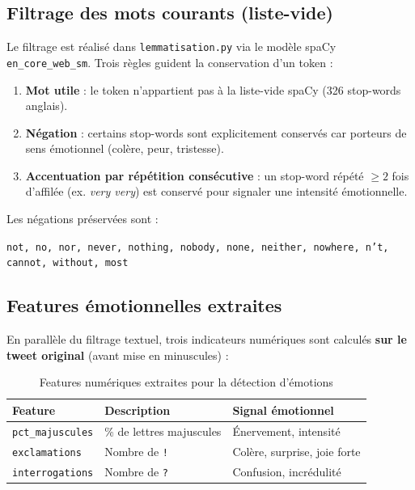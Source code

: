 \documentclass[12pt, a4paper]{article}
\begin{document}
\subsection{Filtrage des mots courants (liste-vide)}

Le filtrage est réalisé dans \texttt{lemmatisation.py} via le modèle spaCy
\texttt{en\_core\_web\_sm}. Trois règles guident la conservation d'un token :

\begin{enumerate}
    \item \textbf{Mot utile} : le token n'appartient pas à la liste-vide spaCy (326 stop-words anglais).
    \item \textbf{Négation} : certains stop-words sont explicitement conservés car porteurs de sens
          émotionnel (colère, peur, tristesse).
    \item \textbf{Accentuation par répétition consécutive} : un stop-word répété $\geq 2$ fois
          d'affilée (ex. \textit{very very}) est conservé pour signaler une intensité émotionnelle.
\end{enumerate}

Les négations préservées sont :

\begin{center}
\texttt{not, no, nor, never, nothing, nobody, none, neither, nowhere, n't, cannot, without, most}
\end{center}

\subsection{Features émotionnelles extraites}

En parallèle du filtrage textuel, trois indicateurs numériques sont calculés
\textbf{sur le tweet original} (avant mise en minuscules) :

\begin{table}[h!]
\centering
\begin{tabular}{lll}
\toprule
\textbf{Feature} & \textbf{Description} & \textbf{Signal émotionnel} \\
\midrule
\texttt{pct\_majuscules} & \% de lettres majuscules & Énervement, intensité \\
\texttt{exclamations}    & Nombre de \texttt{!}     & Colère, surprise, joie forte \\
\texttt{interrogations}  & Nombre de \texttt{?}     & Confusion, incrédulité \\
\bottomrule
\end{tabular}
\caption{Features numériques extraites pour la détection d'émotions}
\end{table}
\end{document}
